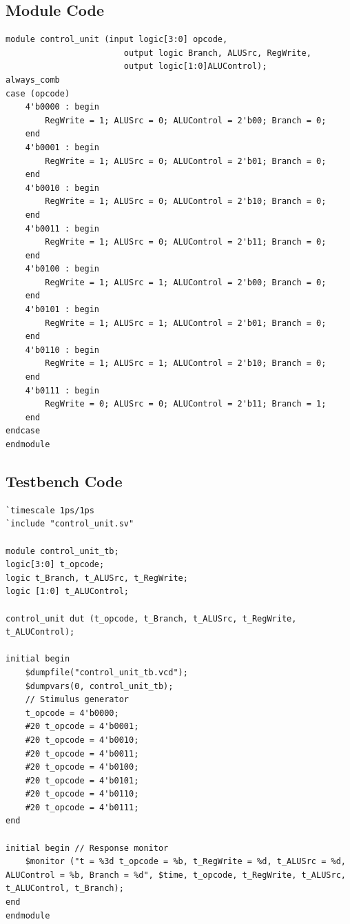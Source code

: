 \documentclass{article}
\begin{document}
\subsection{Module Code}
\begin{lstlisting}
module control_unit (input logic[3:0] opcode,
                        output logic Branch, ALUSrc, RegWrite,
                        output logic[1:0]ALUControl);
always_comb
case (opcode)
    4'b0000 : begin
        RegWrite = 1; ALUSrc = 0; ALUControl = 2'b00; Branch = 0;
    end
    4'b0001 : begin
        RegWrite = 1; ALUSrc = 0; ALUControl = 2'b01; Branch = 0;
    end
    4'b0010 : begin
        RegWrite = 1; ALUSrc = 0; ALUControl = 2'b10; Branch = 0;
    end
    4'b0011 : begin
        RegWrite = 1; ALUSrc = 0; ALUControl = 2'b11; Branch = 0;
    end
    4'b0100 : begin
        RegWrite = 1; ALUSrc = 1; ALUControl = 2'b00; Branch = 0;
    end
    4'b0101 : begin
        RegWrite = 1; ALUSrc = 1; ALUControl = 2'b01; Branch = 0;
    end
    4'b0110 : begin
        RegWrite = 1; ALUSrc = 1; ALUControl = 2'b10; Branch = 0;
    end
    4'b0111 : begin
        RegWrite = 0; ALUSrc = 0; ALUControl = 2'b11; Branch = 1;
    end
endcase
endmodule
\end{lstlisting}
\subsection{Testbench Code}
\begin{lstlisting}
`timescale 1ps/1ps
`include "control_unit.sv"

module control_unit_tb;
logic[3:0] t_opcode;
logic t_Branch, t_ALUSrc, t_RegWrite;
logic [1:0] t_ALUControl;

control_unit dut (t_opcode, t_Branch, t_ALUSrc, t_RegWrite, t_ALUControl);

initial begin
    $dumpfile("control_unit_tb.vcd"); 
    $dumpvars(0, control_unit_tb);
    // Stimulus generator
    t_opcode = 4'b0000;
    #20 t_opcode = 4'b0001;
    #20 t_opcode = 4'b0010;
    #20 t_opcode = 4'b0011;
    #20 t_opcode = 4'b0100;
    #20 t_opcode = 4'b0101;
    #20 t_opcode = 4'b0110;
    #20 t_opcode = 4'b0111;
end

initial begin // Response monitor
    $monitor ("t = %3d t_opcode = %b, t_RegWrite = %d, t_ALUSrc = %d, ALUControl = %b, Branch = %d", $time, t_opcode, t_RegWrite, t_ALUSrc, t_ALUControl, t_Branch);
end
endmodule
\end{lstlisting}
\end{document}
